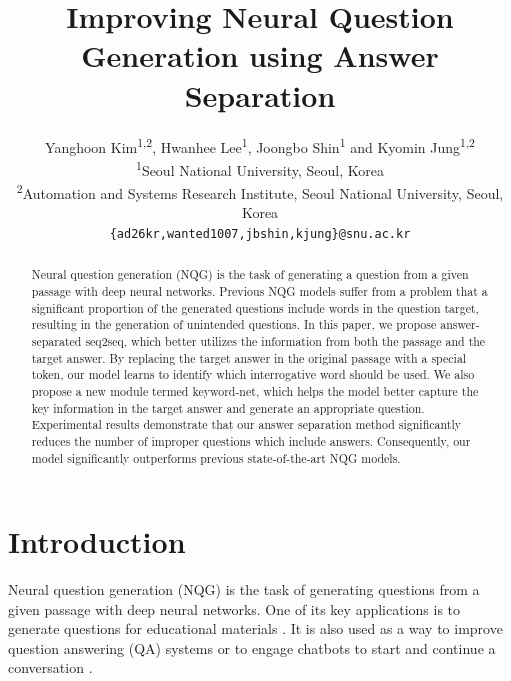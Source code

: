 \documentclass[letterpaper]{article} %
\begin{document}
\title{Improving Neural Question Generation using Answer Separation}
\author{Yanghoon Kim\textsuperscript{1,2}, Hwanhee Lee\textsuperscript{1}, Joongbo Shin\textsuperscript{1} and Kyomin Jung\textsuperscript{1,2}\\
  \textsuperscript{1}Seoul National University, Seoul, Korea \\
  \textsuperscript{2}Automation and Systems Research Institute, Seoul National University, Seoul, Korea\\
  {\tt \{ad26kr,wanted1007,jbshin,kjung\}@snu.ac.kr} \\
}
\maketitle
\begin{abstract}
Neural question generation (NQG) is the task of generating a question from a given passage with deep neural networks. Previous NQG models suffer from a problem that a significant proportion of the generated questions include words in the question target, resulting in the generation of unintended questions. In this paper, we propose answer-separated seq2seq, which better utilizes the information from both the passage and the target answer. By replacing the target answer in the original passage with a special token, our model learns to identify which interrogative word should be used.
We also propose a new module termed keyword-net, which helps the model better capture the key information in the target answer and generate an appropriate question. Experimental results demonstrate that our answer separation method significantly reduces the number of  improper questions which include answers. Consequently, our model significantly outperforms previous state-of-the-art NQG models.


\end{abstract}

\section{Introduction}

\noindent Neural question generation (NQG) is the task of generating questions from a given passage with deep neural networks.
One of its key applications is to generate questions for educational materials \cite{heilman2010good}. It is also used as a way to improve question answering (QA) systems \cite{duan2017question,tang2017question,tang2018learning} or to engage chatbots to start and continue a conversation \cite{mostafazadeh2016generating}.
\end{document}
